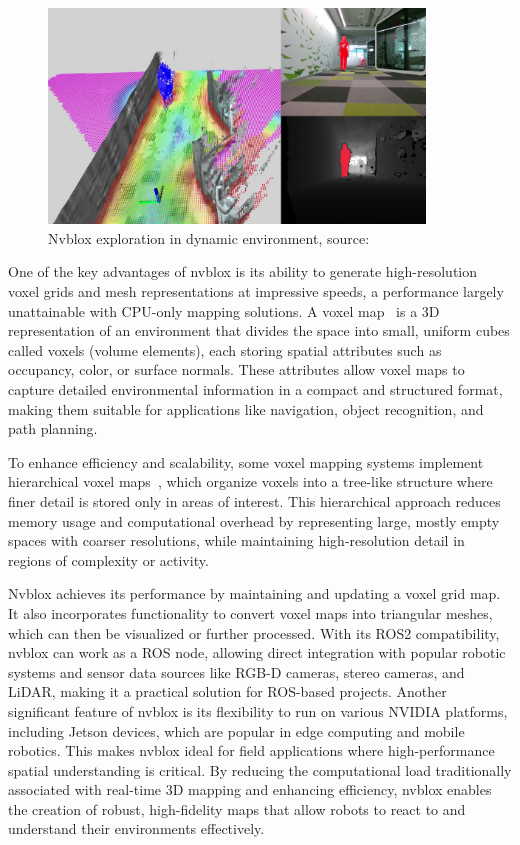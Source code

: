 \begin{figure}[htbp]
    \centering
    \includegraphics[width=100mm, keepaspectratio]{figures_jpg/nvblox_applied_techs.jpg}
    \caption{Nvblox exploration in dynamic environment, source:~\cite{nvblox}}
    \label{fig:nvblox_applied_techs}
\end{figure}

One of the key advantages of nvblox is its ability to generate high-resolution voxel grids and mesh representations at impressive speeds, a performance largely unattainable with CPU-only mapping solutions. A voxel map~\cite{voxelmap} is a 3D representation of an environment that divides the space into small, uniform cubes called voxels (volume elements), each storing spatial attributes such as occupancy, color, or surface normals. These attributes allow voxel maps to capture detailed environmental information in a compact and structured format, making them suitable for applications like navigation, object recognition, and path planning.

To enhance efficiency and scalability, some voxel mapping systems implement hierarchical voxel maps~\cite{hierarchical_voxelmap}, which organize voxels into a tree-like structure where finer detail is stored only in areas of interest. This hierarchical approach reduces memory usage and computational overhead by representing large, mostly empty spaces with coarser resolutions, while maintaining high-resolution detail in regions of complexity or activity.

Nvblox achieves its performance by maintaining and updating a voxel grid map. It also incorporates functionality to convert voxel maps into triangular meshes, which can then be visualized or further processed. With its ROS2 compatibility, nvblox can work as a ROS node, allowing direct integration with popular robotic systems and sensor data sources like RGB-D cameras, stereo cameras, and LiDAR, making it a practical solution for ROS-based projects.
Another significant feature of nvblox is its flexibility to run on various NVIDIA platforms, including Jetson devices, which are popular in edge computing and mobile robotics. This makes nvblox ideal for field applications where high-performance spatial understanding is critical. By reducing the computational load traditionally associated with real-time 3D mapping and enhancing efficiency, nvblox enables the creation of robust, high-fidelity maps that allow robots to react to and understand their environments effectively.

